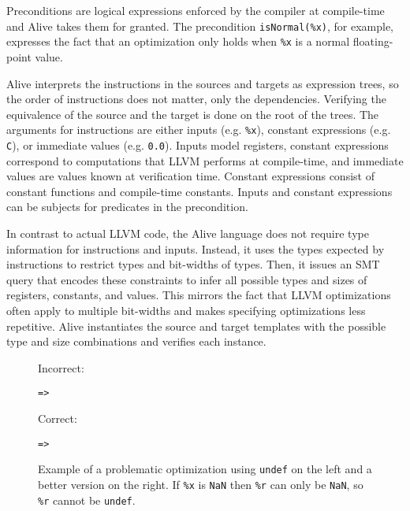 \documentclass[preprint, numbers]{sigplanconf}
\begin{document}
Preconditions are logical expressions enforced by the compiler at compile-time
and Alive takes them for granted. The precondition \texttt{isNormal(\%x)}, for
example, expresses the fact that an optimization only holds when \texttt{\%x}
is a normal floating-point value.

Alive interprets the instructions in the sources and targets as expression
trees, so the order of instructions does not matter, only the dependencies.
Verifying the equivalence of the source and the target is done on the root of
the trees. The arguments for instructions are either inputs (e.g.
\texttt{\%x}), constant expressions (e.g. \texttt{C}), or immediate values
(e.g. \texttt{0.0}). Inputs model registers, constant expressions correspond to
computations that LLVM performs at compile-time, and immediate values are
values known at verification time. Constant expressions consist of constant
functions and compile-time constants. Inputs and constant expressions can be
subjects for predicates in the precondition.

In contrast to actual LLVM code, the Alive language does not require type
information for instructions and inputs. Instead, it uses the types expected by
instructions to restrict types and bit-widths of types. Then, it issues an SMT
query that encodes these constraints to infer all possible types and sizes of
registers, constants, and values. This mirrors the fact that LLVM optimizations
often apply to multiple bit-widths and makes specifying optimizations less
repetitive. Alive instantiates the source and target templates with the
possible type and size combinations and verifies each instance.

\begin{figure}
\small
\centering
\begin{minipage}{3.5cm}
Incorrect:
\begin{Verbatim}
=>
\end{Verbatim}
\end{minipage} \begin{minipage}{3.5cm}
Correct:
\begin{Verbatim}
=>
\end{Verbatim}
\end{minipage} 

\caption{Example of a problematic optimization using \texttt{undef} on the left
and a better version on the right. If \texttt{\%x} is \texttt{NaN} then
\texttt{\%r} can only be \texttt{NaN}, so \texttt{\%r} cannot be
\texttt{undef}.}

\label{fig:undef}

\end{figure}
\end{document}
